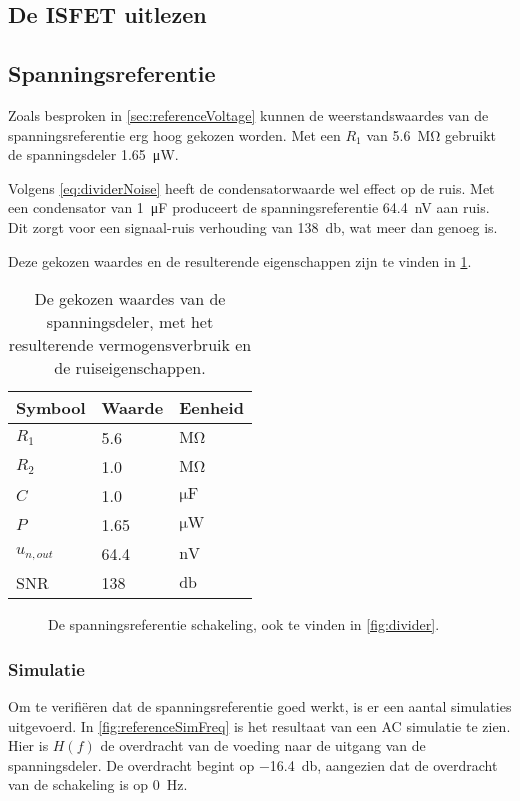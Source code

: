 \subsection{De ISFET uitlezen}



\subsection{Spanningsreferentie}
Zoals besproken in \cref{sec:referenceVoltage} kunnen de weerstandswaardes van de spanningsreferentie erg hoog gekozen worden. Met een $R_1$ van \qty{5.6}{\mega\ohm} gebruikt de spanningsdeler \qty{1.65}{\micro\watt}.

Volgens \cref{eq:dividerNoise} heeft de condensatorwaarde wel effect op de ruis. Met een condensator van \qty{1}{\micro\farad} produceert de spanningsreferentie \qty{64.4}{\nano\volt} aan ruis. Dit zorgt voor een signaal-ruis verhouding van \qty{138}{\decibel}, wat meer dan genoeg is.

Deze gekozen waardes en de resulterende eigenschappen zijn te vinden in \cref{tab:divider}.

\begin{table}[!htbp]
    \centering
    \begin{tabular}{l|l|l}
        Symbool & Waarde & Eenheid \\
        \hline
        $R_1$       & 5.6  & $\si{\mega\ohm}$   \\
        $R_2$       & 1.0  & $\si{\mega\ohm}$   \\
        $C$         & 1.0  & $\si{\micro\farad}$\\
        $P$         & 1.65 & $\si{\micro\watt}$ \\
        $u_{n,out}$ & 64.4 & $\si{\nano\volt}$  \\
        SNR         & 138  & $\si{\decibel}$
    \end{tabular}
    \caption{De gekozen waardes van de spanningsdeler, met het resulterende vermogensverbruik en de ruiseigenschappen.}
    \label{tab:divider}
\end{table}

\begin{figure}[!htbp]
    \centering
    \def\svgwidth{7cm}
    
    \caption{De spanningsreferentie schakeling, ook te vinden in \cref{fig:divider}.}
    \label{fig:dividerForContext}
\end{figure}

\subsubsection{Simulatie}
Om te verifiëren dat de spanningsreferentie goed werkt, is er een aantal simulaties uitgevoerd.
In \cref{fig:referenceSimFreq} is het resultaat van een AC simulatie te zien. Hier is $H(f)$ de overdracht van de voeding naar de uitgang van de spanningsdeler. De overdracht begint op \qty{-16.4}{\decibel}, aangezien dat de overdracht van de schakeling is op \qty{0}{\hertz}.

